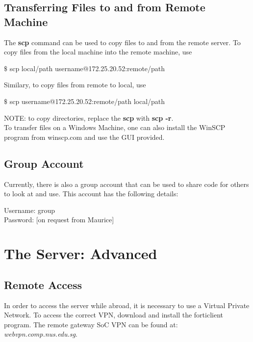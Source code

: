 \section{Transferring Files to and from Remote Machine}

The \textbf{scp} command can be used to copy files to and from the remote server. To copy files from the local machine into the remote machine, use 

\begin{framed}
$\$$ scp local/path username@172.25.20.52:remote/path
\end{framed}

Similary, to copy files from remote to local, use 

\begin{framed}
$\$$ scp username@172.25.20.52:remote/path local/path 
\end{framed}

NOTE: to copy directories, replace the \textbf{scp} with \textbf{scp -r}.\\

To transfer files on a Windows Machine, one can also install the WinSCP program from winscp.com and use the GUI provided.

\section{Group Account}
Currently, there is also a group account that can be used to share code for others to look at and use. This account has the following details:
\begin{mdframed}
Username: group\\
Password: [on request from Maurice]
\end{mdframed}

\chapter{The Server: Advanced}

\section{Remote Access}

In order to access the server while abroad, it is necessary to use a Virtual Private Network. To access the correct VPN, download and install the forticlient program. The remote gateway SoC VPN can be found at: \textit{webvpn.comp.nus.edu.sg}.\\

